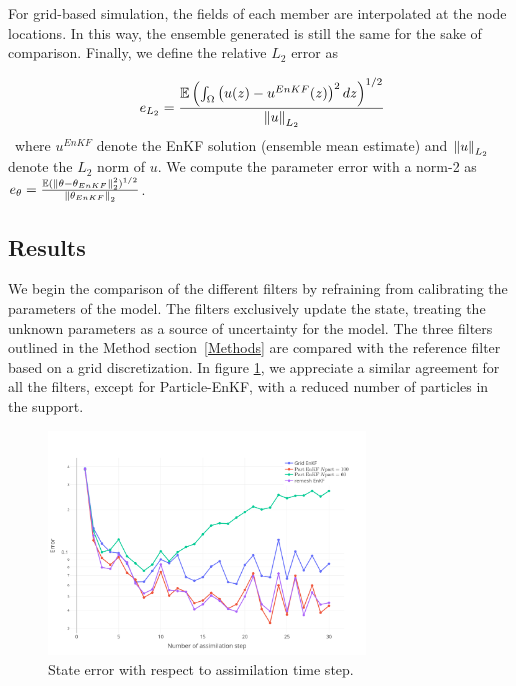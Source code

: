 For grid-based simulation, the fields of each member are interpolated at the node locations. In this way, the ensemble generated is still the same for the sake of comparison.
Finally, we define the relative $L_2$ error as

\begin{equation}~\label{eq:L2_error}
	e_{L_2} =\frac{\mathbb E \left(\int_\Omega \left(u(z) - u^{EnKF}(z)\right)^2 dz\right)^{1/2}}{\left\lVert u \right\rVert_{L_2}}
\end{equation}~where $u^{EnKF}$ denote the EnKF solution (ensemble mean estimate) and $\left\lVert u \right\rVert_{L_2}$ denote the $L_2$ norm of $u$. We compute the parameter error with a norm-2 as $e_{\theta} = \frac{\mathbb E (\left\lVert \theta - \theta_{EnKF} \right\rVert_2^2)^{1/2}}{\left\lVert \theta_{EnKF} \right\rVert_2}$.

\subsection{Results}

We begin the comparison of the different filters by refraining from calibrating the parameters of the model. The filters exclusively update the state, treating the unknown parameters as a source of uncertainty for the model. The three filters outlined in the Method section~\ref{Methods} are compared with the reference filter based on a grid discretization.
In figure \ref{fig:1d_error_time}, we appreciate a similar agreement for all the filters, except for Particle-EnKF, with a reduced number of particles in the support.

\begin{figure}
	\centering
	\includegraphics[width=0.75\textwidth]{images/app1d/wo_calibration/state_error.png}
	\caption{State error with respect to assimilation time step.}
	\label{fig:1d_error_time}
\end{figure}


